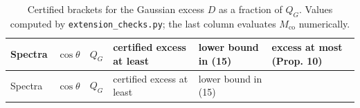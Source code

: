 \documentclass[
  british,
  11pt,
  a4paper,
]{article}
\begin{document}
\begin{longtable}[]{@{}
  >{\raggedright\arraybackslash}p{}
  >{\raggedleft\arraybackslash}p{}
  >{\raggedleft\arraybackslash}p{}
  >{\raggedleft\arraybackslash}p{}
  >{\raggedleft\arraybackslash}p{}
  >{\raggedleft\arraybackslash}p{}@{}}
\caption{Certified brackets for the Gaussian excess \(D\) as a fraction
of \(Q_G\). Values computed by \protect\texttt{extension\_checks.py};
the last column evaluates \(M_{\mathrm{co}}\)
numerically.}\tabularnewline
\toprule\noalign{}
\begin{minipage}[b]{\linewidth}\raggedright
Spectra
\end{minipage} & \begin{minipage}[b]{\linewidth}\raggedleft
\(\cos\theta\)
\end{minipage} & \begin{minipage}[b]{\linewidth}\raggedleft
\(Q_G\)
\end{minipage} & \begin{minipage}[b]{\linewidth}\raggedleft
certified excess at least
\end{minipage} & \begin{minipage}[b]{\linewidth}\raggedleft
lower bound in (15)
\end{minipage} & \begin{minipage}[b]{\linewidth}\raggedleft
excess at most (Prop. 10)
\end{minipage} \\
\midrule\noalign{}
\endfirsthead
\toprule\noalign{}
\begin{minipage}[b]{\linewidth}\raggedright
Spectra
\end{minipage} & \begin{minipage}[b]{\linewidth}\raggedleft
\(\cos\theta\)
\end{minipage} & \begin{minipage}[b]{\linewidth}\raggedleft
\(Q_G\)
\end{minipage} & \begin{minipage}[b]{\linewidth}\raggedleft
certified excess at least
\end{minipage} & \begin{minipage}[b]{\linewidth}\raggedleft
lower bound in (15)
\end{minipage} & \begin{minipage}[b]{\linewidth}\raggedleft

\end{minipage}
\end{longtable}
\end{document}
